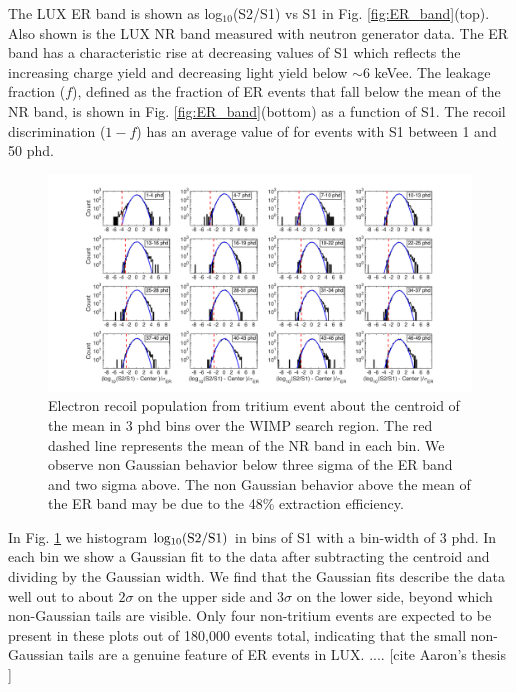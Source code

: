 The LUX ER band is shown as log$_{10}$(S2/S1) vs S1 in Fig. \ref{fig:ER_band}(top).  Also shown is the LUX NR band measured with neutron generator data\cite{DD-paper, lux-reanalysis}. The ER band has a characteristic rise at decreasing values of S1 which reflects the increasing charge yield and decreasing light yield below $\sim$6 keVee. The leakage fraction ($f$), defined as the fraction of ER events that fall below the mean of the NR band, is shown in Fig. \ref{fig:ER_band}(bottom) as a function of S1. The recoil discrimination ($1-f$) has an average value of  for events with S1 between 1 and 50 phd.


\onecolumngrid
\break
\begin{figure}\centering
\includegraphics[width=220mm]{fig/Gaussianity/GaussER_all.png}
\caption{Electron recoil population from tritium event about the centroid of the mean in 3 phd bins over the WIMP search region. The red dashed line represents the mean of the NR band in each bin. We observe non Gaussian behavior below three sigma of the ER band and two sigma above. The non Gaussian behavior above the mean of the ER band may be due to the 48\% extraction efficiency.  }
\label{fig:ER-Gauss}
\end{figure}
\twocolumngrid

In Fig. \ref{fig:ER-Gauss} we histogram $\rm log_{10}(S2/S1)$ in bins of S1 with a bin-width of 3 phd. In each bin we show a Gaussian fit to the data after subtracting the centroid and dividing by the Gaussian width. We find that the Gaussian fits describe the data well out to about $2\sigma$ on the upper side and $3\sigma$ on the lower side, beyond which non-Gaussian tails are visible. Only four non-tritium events are expected to be present in these plots out of 180,000 events total, indicating that the small non-Gaussian tails are a genuine feature of ER events in LUX. .... [cite Aaron's thesis ]

